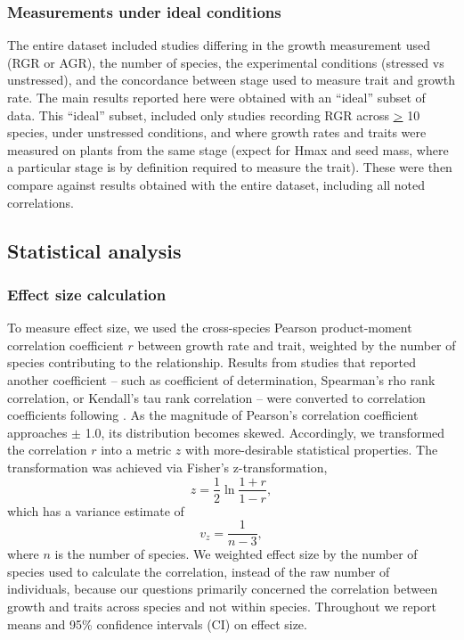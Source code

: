 \documentclass[a4paper,11pt]{article}
\begin{document}
\subsubsection*{Measurements under ideal conditions}\label{ideal-vs-entire-dataset}

The entire dataset included studies differing in the growth measurement used (RGR or AGR), the number of species, the experimental conditions (stressed vs unstressed), and the concordance between stage used to measure trait and growth rate. The main results reported here were obtained with an ``ideal'' subset of data. This ``ideal'' subset, included only studies recording RGR across \underline{\textgreater} 10 species, under unstressed conditions, and where growth rates and traits were measured on plants from the same stage (expect for Hmax and seed mass, where a particular stage is by definition required to measure the trait). These were then compare against results obtained with the entire dataset, including all noted correlations. 

\subsection*{Statistical analysis}\label{statistical-analyses}

\subsubsection*{Effect size calculation}\label{effect-size}

To measure effect size, we used the cross-species Pearson product-moment correlation coefficient $r$ between growth rate and trait, weighted by the number of species contributing to the relationship. Results from studies that reported another coefficient -- such as coefficient of determination, Spearman's rho rank correlation, or Kendall's tau rank correlation -- were converted to correlation coefficients following \citet{Lajeunesse:2013tm}. As the magnitude of Pearson's correlation coefficient approaches $\pm$ 1.0, its distribution becomes skewed. Accordingly, we transformed the correlation $r$ into a metric $z$ with more-desirable statistical properties. The transformation was achieved via Fisher's z-transformation,
\[ z = \frac{1}{2} \ln \frac{1+r}{1-r},\]
which has a variance estimate of
\[ v_z= \frac{1}{n-3},\]
where $n$ is the number of species. We weighted effect size by the number of species used to calculate the correlation, instead of the raw number of individuals, because our questions primarily concerned the correlation between growth and traits across species and not within species. Throughout we report means and 95\% confidence intervals (CI) on effect size.
\end{document}
